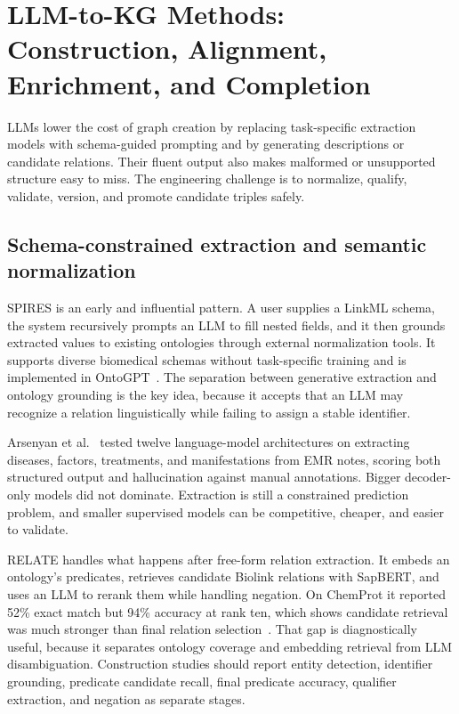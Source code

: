 \section{LLM-to-KG Methods: Construction, Alignment, Enrichment, and Completion}

LLMs lower the cost of graph creation by replacing task-specific extraction models with schema-guided prompting and by generating descriptions or candidate relations. Their fluent output also makes malformed or unsupported structure easy to miss. The engineering challenge is to normalize, qualify, validate, version, and promote candidate triples safely.

\subsection{Schema-constrained extraction and semantic normalization}

SPIRES is an early and influential pattern. A user supplies a LinkML schema, the system recursively prompts an LLM to fill nested fields, and it then grounds extracted values to existing ontologies through external normalization tools. It supports diverse biomedical schemas without task-specific training and is implemented in OntoGPT~\cite{caufield2024spires}. The separation between generative extraction and ontology grounding is the key idea, because it accepts that an LLM may recognize a relation linguistically while failing to assign a stable identifier.

Arsenyan et al.~\cite{arsenyan2024emr} tested twelve language-model architectures on extracting diseases, factors, treatments, and manifestations from EMR notes, scoring both structured output and hallucination against manual annotations. Bigger decoder-only models did not dominate. Extraction is still a constrained prediction problem, and smaller supervised models can be competitive, cheaper, and easier to validate.

RELATE handles what happens after free-form relation extraction. It embeds an ontology's predicates, retrieves candidate Biolink relations with SapBERT, and uses an LLM to rerank them while handling negation. On ChemProt it reported 52\% exact match but 94\% accuracy at rank ten, which shows candidate retrieval was much stronger than final relation selection~\cite{olasunkanmi2026relate}. That gap is diagnostically useful, because it separates ontology coverage and embedding retrieval from LLM disambiguation. Construction studies should report entity detection, identifier grounding, predicate candidate recall, final predicate accuracy, qualifier extraction, and negation as separate stages.


